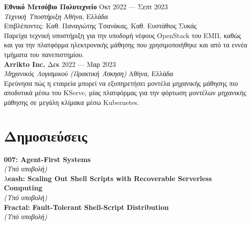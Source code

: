 \documentclass[margin, 12pt]{resume}
\newcommand{\cvName}{Νίκος Παγώνας}
\newcommand{\sectionVSpace}{\vspace{-3.5ex}} %
\newcommand{\authors}[1]{#1\xspace}
\newcommand{\equalContributionNote}{(*ίση συνεισφορά)\xspace}
\newcommand{\fellowship}[1]{\textbf{#1}\xspace}
\newcommand{\institution}[1]{\textbf{#1}\xspace}
\newcommand{\interval}[2]{#1 --- #2\xspace}
\newcommand{\ordinal}[1]{\textsuperscript{#1}\xspace}
\newcommand{\rSection}[1]{\sectionVSpace\section{#1}\xspace}
\newcommand{\paperTitle}[1]{\textbf{#1}\xspace}
\newcommand{\place}[1]{#1\xspace}
\newcommand{\role}[1]{\textit{#1}\xspace}
\newcommand{\stitle}[1]{#1:\xspace}
\newcommand{\underSubmission}{\textit{(Υπό υποβολή)}\xspace}
\newcommand{\venue}[1]{\textit{#1}\xspace}
\begin{document}
\begin{resume}
    \institution{Εθνικό Μετσόβιο Πολυτεχνείο} \hfill \interval{Οκτ 2022}{Σεπτ 2023} \\
    \role{Τεχνική Υποστήριξη} \hfill \place{Αθήνα, Ελλάδα} \\
    \stitle{Επιβλέποντες} Καθ. Παναγιώτης Τσανάκας, Καθ. Ευστάθιος Συκάς \\
    Παρείχα τεχνική υποστήριξη για την υποδομή νέφους OpenStack του ΕΜΠ, καθώς και για την πλατφόρμα ηλεκτρονικής μάθησης που χρησιμοποιήθηκε και από τα εννέα τμήματα του πανεπιστημίου. \\

    \institution{Arrikto Inc.} \hfill \interval{Δεκ 2022}{Μαρ 2023} \\
    \role{Μηχανικός Λογισμικού (Πρακτική Άσκηση)} \hfill \place{Αθήνα, Ελλάδα} \\
    Ερεύνησα πώς η εταιρεία μπορεί να εξυπηρετήσει μοντέλα μηχανικής μάθησης πιο αποδοτικά μέσω του KServe, μίας πλατφόρμας για την φόρτωση μοντέλων μηχανικής μάθησης σε μεγάλη κλίμακα μέσω Kubernetes. \\



    \rSection{Δημοσιεύσεις}

    \newcommand{\me}{\textbf{\cvName}\xspace}

    \paperTitle{007: Agent-First Systems} \\
    \underSubmission \\

    \paperTitle{\( \lambda \)eash: Scaling Out Shell Scripts with Recoverable Serverless Computing} \\
    \underSubmission \\

    \paperTitle{Fractal: Fault-Tolerant Shell-Script Distribution} \\
    \underSubmission \\


\end{resume}
\end{document}
